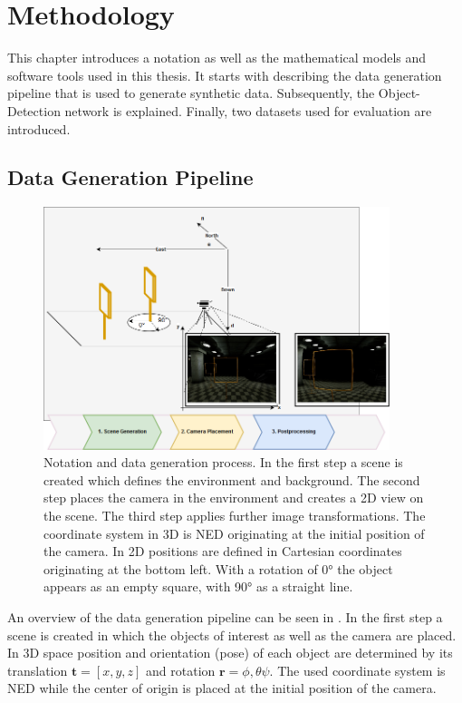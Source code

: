\chapter{Methodology}

This chapter introduces a notation as well as the mathematical models and software tools used in this thesis. It starts with describing the data generation pipeline that is used to generate synthetic data. Subsequently, the Object-Detection network is explained. Finally, two datasets used for evaluation are introduced.

\section{Data Generation Pipeline}
\label{sec:datagen:method}
\begin{figure}[htbp]
	\centering
	\includegraphics[width=0.9\textwidth]{fig/datagen_notation}
	\caption{Notation and data generation process. In the first step a scene is created which defines the environment and background. The second step places the camera in the environment and creates a 2D view on the scene. The third step applies further image transformations. The coordinate system in 3D is \ac{NED} originating at the initial position of the camera. In 2D positions are defined in Cartesian coordinates originating at the bottom left. With a rotation of 0° the object appears as an empty square, with 90° as a straight line.}
	\label{fig:training:datagen_notation}
\end{figure}

An overview of the data generation pipeline can be seen in . In the first step a scene is created in which the objects of interest as well as the camera are placed. In 3D space position and orientation (pose) of each object are determined by its translation $\textbf{t} = [x,y,z]$ and rotation $\textbf{r}={\phi, \theta \psi}$. The used coordinate system is \ac{NED} while the center of origin is placed at the initial position of the camera.

